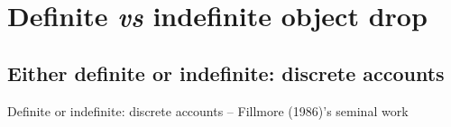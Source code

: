 


\section{Definite \textit{vs} indefinite object drop} 

\subsection{Either definite or indefinite: discrete accounts} 

Definite or indefinite: discrete accounts -- Fillmore (1986)’s seminal work


